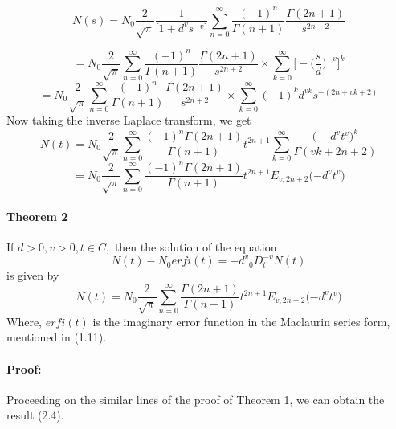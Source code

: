 \documentclass{article}
\begin{document}
\begin{equation*}
    N(s) = N_0
    \frac{2}{\sqrt{\pi}}
    \frac{1}{\big[1+{d^v}{s^{-v}}\big]}
    \sum_{n = 0}^{\infty}
    \frac{(-1)^n}{\Gamma{(n+1)}}
    \frac{\Gamma{(2n+1)}}{s^{2n+2}}
\end{equation*}

\begin{equation*}
    =N_0
    \frac{2}{\sqrt{\pi}}\sum_{n = 0}^{\infty}
    \frac{(-1)^n}{\Gamma{(n+1)}}
    \frac{\Gamma{(2n+1)}}{s^{2n+2}}
    \times \sum_{k = 0}^{\infty}
    \Big[-\Big(\frac{s}{d}\Big)^{-v}\Big]^k
\end{equation*}
\begin{equation*}
    =N_0
    \frac{2}{\sqrt{\pi}}\sum_{n = 0}^{\infty}
    \frac{(-1)^n}{\Gamma{(n+1)}}
    \frac{\Gamma{(2n+1)}}{s^{2n+2}}
    \times \sum_{k = 0}^{\infty}
    (-1)^k d^{vk} s^{-(2n+vk+2)}
\end{equation*}
Now taking the inverse Laplace transform, we get
\begin{equation*}
    N(t)=N_0
    \frac{2}{\sqrt{\pi}}\sum_{n = 0}^{\infty}
    \frac{(-1)^n\Gamma{(2n+1)}}{\Gamma{(n+1)}}
    t^{2n+1}
    \sum_{k = 0}^{\infty}
    \frac{\Big(-d^v{t^v}\Big)^k}{\Gamma{(vk+2n+2)}}
\end{equation*}
\begin{equation*}
    =N_0
    \frac{2}{\sqrt{\pi}}
    \sum_{n = 0}^{\infty} 
    \frac{(-1)^n\Gamma{(2n+1)}}{\Gamma{(n+1)}}
    t^{2n+1}
    E_{v,{2n+2}}
    \Big({-d^v}{t^v}\Big)
\end{equation*}
\paragraph{Theorem 2}
If $d > 0, v > 0, t \in C,$ then the solution of the equation
\begin{equation}
    N(t) - N_0erfi(t) = {-d^v}{_0D_t^{-v}}N(t)
\end{equation}
is given by 
\begin{equation}
    N(t) = N_0
    \frac{2}{\sqrt{\pi}}
    \sum_{n = 0}^{\infty}
    \frac{\Gamma{(2n+1)}}{\Gamma{(n+1)}}
    t^{2n+1}
    E_{v,2n+2}
    \Big({-d^v}{t^v}\Big)
\end{equation}
Where, $erfi(t)$ is the imaginary error function in the Maclaurin series form, mentioned in (1.11).
\paragraph{Proof:}
Proceeding on the similar lines of the proof of Theorem 1, we can obtain the result (2.4).
\end{document}
